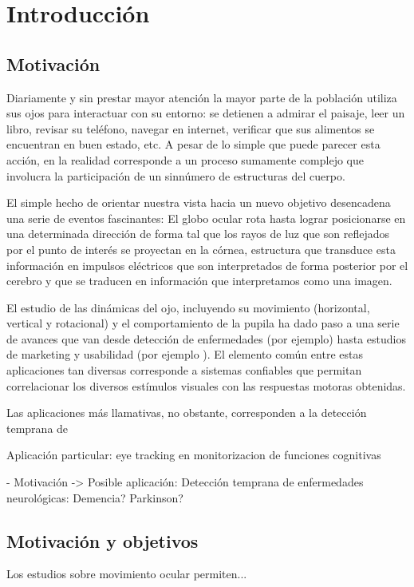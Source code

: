 \documentclass[../main.tex]{subfiles}
\begin{document}
		
\chapter{Introducción}
\label{cha:01_introducción}
	\section{Motivación}
	\label{sec:01_motivacion}

		Diariamente y sin prestar mayor atención la mayor parte de la población utiliza sus ojos para interactuar con su entorno: se detienen a admirar el paisaje, leer un libro, revisar su teléfono, navegar en internet, verificar que sus alimentos se encuentran en buen estado, etc. A pesar de lo simple que puede parecer esta acción, en la realidad corresponde a un proceso sumamente complejo que involucra la participación de un sinnúmero de estructuras del cuerpo. 

		El simple hecho de orientar nuestra vista hacia un nuevo objetivo desencadena una serie de eventos fascinantes: El globo ocular rota hasta lograr posicionarse en una determinada dirección de forma tal que los rayos de luz que son reflejados por el punto de interés se proyectan en la córnea, estructura que transduce esta información en impulsos eléctricos que son interpretados de forma posterior por el cerebro y que se traducen en información que interpretamos como una imagen. 

		El estudio de las dinámicas del ojo, incluyendo su movimiento (horizontal, vertical y rotacional) y el comportamiento de la pupila ha dado paso a una serie de avances que van desde detección de enfermedades (por ejemplo) hasta estudios de marketing y usabilidad (por ejemplo ). El elemento común entre estas aplicaciones tan diversas corresponde a sistemas confiables que permitan correlacionar los diversos estímulos visuales con las respuestas motoras obtenidas.

		Las aplicaciones más llamativas, no obstante, corresponden a la detección temprana de  


		Aplicación particular: eye tracking en monitorizacion de funciones cognitivas

		- Motivación -> Posible aplicación: Detección temprana de enfermedades neurológicas: Demencia? Parkinson?  


	\section{Motivación y objetivos}
	\label{sec:01_motivacón_y_objetivos}
		Los estudios sobre movimiento ocular permiten...
\end{document}
